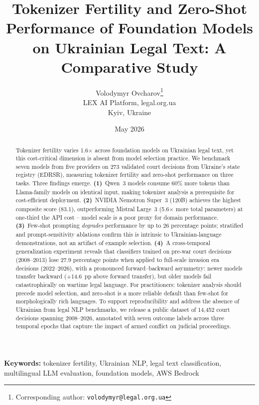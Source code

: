 \documentclass[11pt,a4paper]{article}
\title{Tokenizer Fertility and Zero-Shot Performance of Foundation Models\\on Ukrainian Legal Text: A Comparative Study}
\author{
  Volodymyr Ovcharov\thanks{Corresponding author: \texttt{volodymyr@legal.org.ua}} \\
  LEX AI Platform, legal.org.ua \\
  Kyiv, Ukraine
}
\date{May 2026}
\begin{document}
\maketitle

\begin{abstract}
Tokenizer fertility varies 1.6$\times$ across foundation models on Ukrainian legal text, yet this cost-critical dimension is absent from model selection practice. We benchmark seven models from five providers on 273 validated court decisions from Ukraine's state registry (EDRSR), measuring tokenizer fertility and zero-shot performance on three tasks. Three findings emerge. \textbf{(1)}~Qwen~3 models consume 60\% more tokens than Llama-family models on identical input, making tokenizer analysis a prerequisite for cost-efficient deployment. \textbf{(2)}~NVIDIA Nemotron Super~3 (120B) achieves the highest composite score (83.1), outperforming Mistral Large~3 (5.6$\times$ more total parameters) at one-third the API cost -- model scale is a poor proxy for domain performance. \textbf{(3)}~Few-shot prompting \emph{degrades} performance by up to 26 percentage points; stratified and prompt-sensitivity ablations confirm this is intrinsic to Ukrainian-language demonstrations, not an artifact of example selection. \textbf{(4)}~A cross-temporal generalization experiment reveals that classifiers trained on pre-war court decisions (2008--2013) lose 27.9 percentage points when applied to full-scale invasion era decisions (2022--2026), with a pronounced forward--backward asymmetry: newer models transfer backward (+14.6~pp above forward transfer), but older models fail catastrophically on wartime legal language. For practitioners: tokenizer analysis should precede model selection, and zero-shot is a more reliable default than few-shot for morphologically rich languages. To support reproducibility and address the absence of Ukrainian from legal NLP benchmarks, we release a public dataset of 14{,}452 court decisions spanning 2008--2026, annotated with seven outcome labels across three temporal epochs that capture the impact of armed conflict on judicial proceedings.
\end{abstract}

\noindent\textbf{Keywords:} tokenizer fertility, Ukrainian NLP, legal text classification, multilingual LLM evaluation, foundation models, AWS Bedrock

\end{document}
